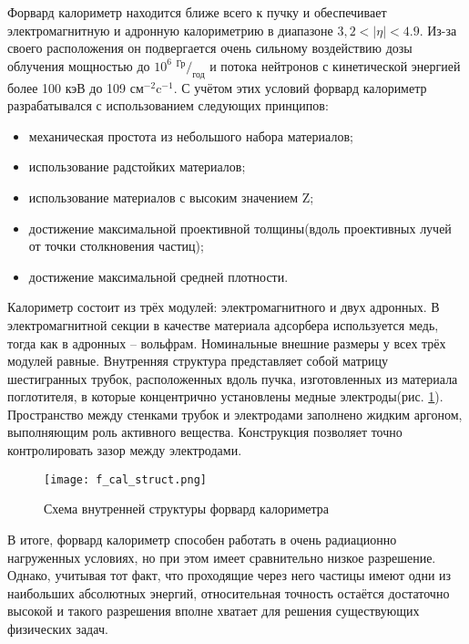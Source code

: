 Форвард калориметр находится ближе всего к пучку и обеспечивает электромагнитную и адронную калориметрию в диапазоне $3,2 < |\eta| < 4.9$. Из-за своего расположения он подвергается очень сильному воздействию дозы облучения мощностью до $10^6$ ${^\text{Гр}} / _\text{год}$ и потока нейтронов с кинетической энергией более 100 кэВ до 109 $\text{см}^{-2}\text{c}^{-1}$\parencite{tdr_old}. С учётом этих условий форвард калориметр разрабатывался с использованием следующих принципов:
\begin{itemize}
    \item механическая простота из небольшого набора материалов;
    \item использование радстойких материалов;
    \item использование материалов с высоким значением Z;
    \item достижение максимальной проективной толщины(вдоль проективных лучей от точки столкновения частиц);
    \item достижение максимальной средней плотности.
\end{itemize}\par
Калориметр состоит из трёх модулей: электромагнитного и двух адронных. В электромагнитной секции в качестве материала адсорбера используется медь, тогда как в адронных -- вольфрам. Номинальные внешние размеры у всех трёх модулей равные. Внутренняя структура представляет собой матрицу шестигранных трубок, расположенных вдоль пучка, изготовленных из материала поглотителя, в которые концентрично установлены медные электроды(рис. \ref{fig:f_cal_struct}). Пространство между стенками трубок и электродами заполнено жидким аргоном, выполняющим роль активного вещества. Конструкция позволяет точно контролировать зазор между электродами.
\begin{figure}[ht]
    \centering
    \texttt{[image: f\_cal\_struct.png]}
    \caption{Схема внутренней структуры форвард калориметра\parencite{tdr_old}}
    \label{fig:f_cal_struct}
\end{figure}\par
В итоге, форвард калориметр способен работать в очень радиационно нагруженных условиях, но при этом имеет сравнительно низкое разрешение. Однако, учитывая тот факт, что проходящие через него частицы имеют одни из наибольших абсолютных энергий, относительная точность остаётся достаточно высокой и такого разрешения вполне хватает для решения существующих физических задач.
